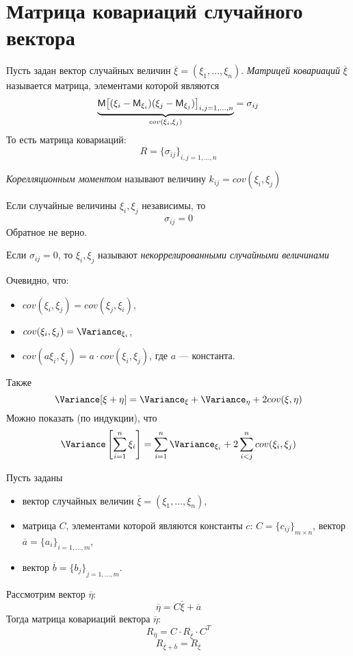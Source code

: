 \section{Матрица ковариаций случайного вектора}
\begin{definition}
  Пусть задан вектор случайных величин $\overline{\xi} = (\xi_1, \ldots, \xi_n)$. \textit{Матрицей ковариаций} $\overline{\xi}$ называется матрица, элементами которой являются
  \[
    \underbrace{\mathsf{M} {\left[ (\xi_i - \mathsf{M}_{\xi_i})(\xi_j - \mathsf{M}_{\xi_j})\right]}_{i, j = 1, \ldots, n}}_{cov(\xi_i, \xi_j)} = \sigma_{ij}
  \]
  То есть матрица ковариаций:
  \[
    R = {\{ \sigma_{ij} \}}_{i, j = 1, \ldots, n}
  \]
\end{definition}
\begin{definition}
  \textit{Корелляционным моментом} называют величину $k_{ij} = cov(\xi_i, \xi_j)$
\end{definition}
Если случайные величины $\xi_i, \xi_j$ независимы, то
\[
  \sigma_{ij} = 0
\]
Обратное не верно. \\
\begin{definition}
  Если $\sigma_{ij} = 0$, то $\xi_i, \xi_j$ называют \textit{некоррелированными случайными величинами}
\end{definition}
Очевидно, что:
\begin{itemize}
  \item $cov(\xi_i, \xi_j) = cov(\xi_j, \xi_i)$,
  \item $cov(\xi_i, \xi_j) = \Variance_{\xi_i}$,
  \item $cov(a\xi_i, \xi_j) = a \cdot cov(\xi_i, \xi_j)$, где $a$ --- константа.
\end{itemize}
Также
\[
  \Variance [\xi + \eta] = \Variance_{\xi} + \Variance_{\eta} + 2cov(\xi, \eta)
\]
Можно показать (по индукции), что
\[
  \Variance \left[ \sum\limits_{i = 1}^n \xi_i \right] = \sum\limits_{i = 1}^n \Variance_{\xi_i} + 2 \sum\limits_{i < j}^n cov(\xi_i, \xi_j)
\]
\begin{theorem}
  Пусть заданы
  \begin{itemize}
    \item вектор случайных величин $\overline{\xi} = (\xi_1, \ldots, \xi_n)$,
    \item матрица $C$, элементами которой являются константы $c$: $C = {\{ c_{ij}\}}_{m \times n}$, вектор $\overline{a} = {\{ a_i \}}_{i = 1, \ldots, m}$,
    \item вектор $\overline{b} = {\{ b_j \}}_{j = 1, \ldots, m}$.
  \end{itemize}
  Рассмотрим вектор $\overline{\eta}$:
  \[
    \overline{\eta} = C \overline{\xi} + \overline{a}
  \]
  Тогда матрица ковариаций вектора $\overline{\eta}$:
  \[
    R_{\overline{\eta}} = C \cdot R_{\overline{\xi}} \cdot C^T
  \]
  \[
    R_{\overline{\xi} + \overline{b}} = R_{\overline{\xi}}
  \]
\end{theorem}
